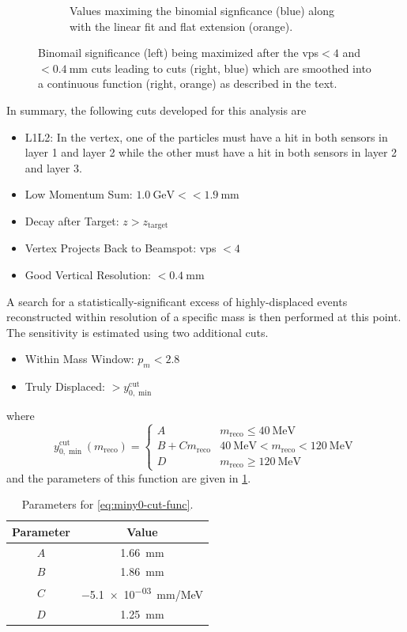 \begin{figure}
\begin{subfigure}{0.48\textwidth}
    \caption{%
      Values maximing the binomial signficance (blue) along with the linear fit and flat extension (orange).
    }
    \label{fig:miny0-opt:fit}
  \end{subfigure}
  \caption{%
    Binomail significance (left) being maximized after the \ac{vps}$< 4$ and
    \maxyzeroerr$<\qty{0.4}{\mm}$ cuts leading to cuts (right, blue) which are
    smoothed into a continuous function (right, orange) as described in the text.
  }
  \label{fig:miny0-opt}
\end{figure}

In summary, the following cuts developed for this analysis are
\begin{itemize}
  \item L1L2: In the vertex, one of the particles must have a hit in both sensors in
    layer 1 and layer 2 while the other must have a hit in both sensors in layer 2 and layer 3.
  \item Low Momentum Sum: $\qty{1.0}{\GeV} < $\Psum$ < \qty{1.9}{\mm}$
  \item Decay after Target: $z > z_\mathrm{target}$
  \item Vertex Projects Back to Beamspot: \ac{vps} $< 4$
  \item Good Vertical Resolution: \maxyzeroerr$< \qty{0.4}{\mm}$
\end{itemize}
A search for a statistically-significant excess of highly-displaced events
reconstructed within resolution of a specific mass is then performed at this point.
The sensitivity is estimated using two additional cuts.
\begin{itemize}
  \item Within Mass Window: $p_m < 2.8$
  \item Truly Displaced: \minyzero$> y_{0,\min}^\mathrm{cut}$
\end{itemize}
where
\begin{equation} \label{eq:miny0-cut-func}
  y_{0,\min}^\mathrm{cut}(m_\mathrm{reco}) = \begin{cases}
    A & m_\mathrm{reco} \leq \qty{40}{\MeV} \\
    B+Cm_\mathrm{reco} & \qty{40}{\MeV} < m_\mathrm{reco} < \qty{120}{\MeV} \\
    D & m_\mathrm{reco} \geq \qty{120}{\MeV} 
  \end{cases}
\end{equation}
and the parameters of this function are given in \cref{tab:miny0-cut-params}.

\begin{table}
  \centering
  \begin{tabular}{c|c}
    Parameter & Value \\ \hline
    $A$ & \qty{1.66}{\mm} \\
    $B$ & \qty{1.86}{\mm} \\
    $C$ & \qty{-5.1e-03}{\mm/\MeV} \\
    $D$ & \qty{1.25}{\mm}
  \end{tabular}
  \caption{Parameters for \cref{eq:miny0-cut-func}.}
  \label{tab:miny0-cut-params}
\end{table}

